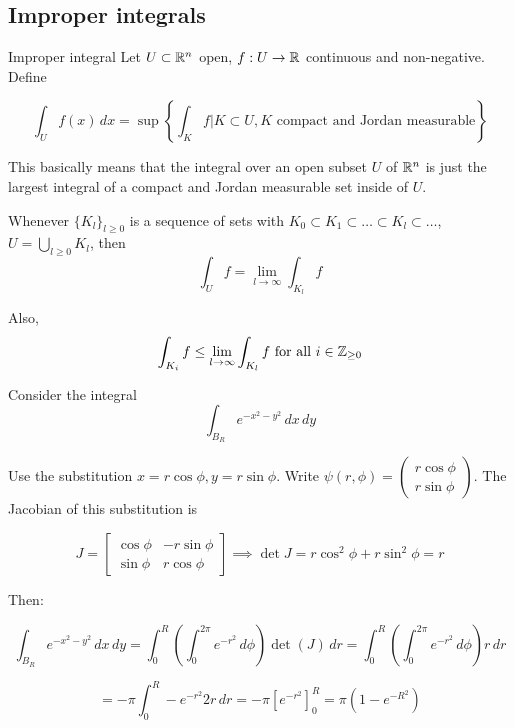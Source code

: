 \documentclass[12pt]{article}
\begin{document}
\subsection{Improper integrals}

\begin{definition}{Improper integral}{}
Let $U \subset \mathbb{R}^n$ open, $f: U \rightarrow \mathbb{R}$ continuous and non-negative. Define

$$
\int_{U} f(x) \,dx = \sup \left\{\int_{K} f | K \subset U, K \text { compact and Jordan measurable}\right\}
$$
\end{definition}

This basically means that the integral over an open subset $U$ of $\mathbb{R}^n$ is just the largest integral of a compact and Jordan measurable set inside of $U$.

\begin{remark}{}{}
Whenever $\{K_l\}_{l \geq 0}$ is a sequence of sets with $K_0 \subset K_1 \subset \dots \subset K_l \subset \dots$, $U = \bigcup\limits_{l \geq 0} K_l$, then
$$
\int_{U} f = \lim_{l \rightarrow \infty} \int_{K_l} f
$$

Also,
$$
\int_{K_i} f \leq \lim_{l \rightarrow \infty}\int_{K_l} f \text{ for all } i \in \mathbb{Z}_{\geq 0}
$$
\end{remark}

\begin{example}{}{}
Consider the integral
$$
\int_{B_R} e^{-x^2-y^2} \,dx \,dy
$$

Use the substitution $x = r \cos \phi, y = r \sin \phi$. Write $\psi(r, \phi) = \begin{pmatrix} r \cos \phi \\ r \sin \phi \end{pmatrix}$. The Jacobian of this substitution is

\[
J = 
\begin{bmatrix}
\cos \phi & -r \sin \phi \\
\sin \phi & r \cos \phi
\end{bmatrix}
\implies \det J = r \cos^2 \phi + r \sin^2 \phi = r
\]

Then:

$$
\int_{B_R} e^{-x^2-y^2} \,dx \,dy = \int_{0}^{R} \left(\int_{0}^{2\pi} e^{-r^2} \,d\phi \right) \det(J) \,dr = \int_{0}^{R} \left(\int_{0}^{2\pi} e^{-r^2} \,d\phi \right) r \,dr 
$$

$$
= -\pi \int_{0}^{R} -e^{-r^2} 2r \,dr = -\pi \left[e^{-r^2}\right]_0^R=\pi\left(1-e^{-R^2}\right)
$$

\end{example}
\end{document}
